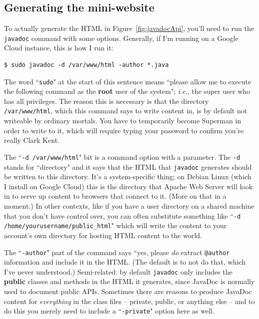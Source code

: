 \subsection{Generating the mini-website}

To actually generate the HTML in Figure~\ref{fig:javadocApi}, you'll need to
run the \texttt{javadoc} command with some options. Generally, if I'm running
on a Google Cloud instance, this is how I run it:

\begin{Verbatim}[fontsize=\small,samepage=true,frame=none]
$ sudo javadoc -d /var/www/html -author *.java
\end{Verbatim}

The word ``\texttt{sudo}" at the start of this sentence means ``please allow
me to execute the following command as the \textbf{root} user of the system";
\textit{i.e.}, the super user who has all privileges. The reason this is
necessary is that the directory \texttt{/var/www/html}, which this command
says to write content in, is by default not writeable by ordinary mortals. You
have to temporarily become Superman in order to write to it, which will
require typing your password to confirm you're really Clark Kent.

The ``\texttt{-d /var/www/html}" bit is a command option with a parameter. The
\texttt{-d} stands for ``directory" and it says that the HTML that
\texttt{javadoc} generates should be written to this directory. It's a
system-specific thing; on Debian Linux (which I install on Google Cloud) this
is the directory that Apache Web Server will look in to serve up content to
browsers that connect to it. (More on that in a moment.) In other contexts,
like if you have a user directory on a shared machine that you don't have
control over, you can often substitute something like ``\texttt{-d
/home/yourusername/public\_html}" which will write the content to your
account's own directory for hosting HTML content to the world.

The ``\texttt{-author}" part of the command says ``yes, please \textit{do}
extract \texttt{@author} information and include it in the HTML. (The default
is to not do that, which I've never understood.) Semi-related: by default
\texttt{javadoc} only includes the \textbf{public} classes and methods in the
HTML it generates, since JavaDoc is normally used to document public APIs.
Sometimes there are reasons to produce JavaDoc content for \textit{everything}
in the class files -- private, public, or anything else -- and to do this you
merely need to include a ``\texttt{-private}" option here as well.

